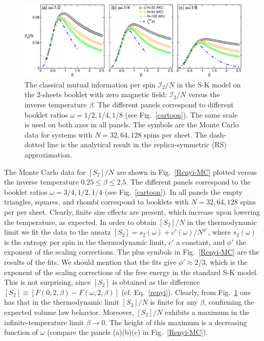 \documentclass[twocolumn,superscriptaddress,prb,10pt]{revtex4-1}
\begin{document}
\begin{figure}[t]
\includegraphics*[width=0.93\linewidth]{./draft_figs/I2_MC_v1}
\caption{The classical mutual information per spin ${\mathcal I}_2/N$ 
 in the S-K model on the $2$-sheets booklet with zero magnetic field: 
 ${\mathcal I}_2/N$ versus the inverse temperature $\beta$. The 
 different panels correspond to different booklet ratios $\omega=1/2,1/4,1/8$ 
 (see Fig.~\ref{cartoon}). The same scale is used on both axes in all 
 panels. The symbols are the Monte Carlo data 
 for systems with $N=32,64,128$ spins per sheet. The dash-dotted line is 
 the analytical result in the replica-symmetric (RS) approximation.  
}
\label{I2-MC}
\end{figure}

The Monte Carlo data for $[S_2]/N$  are shown in Fig.~\ref{Renyi-MC} plotted versus the 
inverse temperature $0.25\le\beta\le 2.5$. The different panels correspond to the  
booklet ratios $\omega=3/4,1/2,1/4$ (see Fig.~\ref{cartoon}). In all panels the empty 
triangles, squares, and rhombi correspond to booklets with $N=32,64,128$ spins per per sheet. 
Clearly, finite size effects are present, which increase upon lowering 
the temperature, as expected. In order to obtain $[S_2]/N$ in the thermodynamic limit 
we fit the data to the ansatz $[S_2]=s_2(\omega)+c'(\omega)/N^{\phi'}$, where 
$s_2(\omega)$ is the entropy per spin in the thermodynamic limit, $c'$ a constant, and 
$\phi'$ the exponent of the scaling corrections. The plus symbols in Fig.~\ref{Renyi-MC} 
are the results of the fits. We should mention that the fits give $\phi'\approx 2/3$, 
which is the exponent of the scaling corrections of the free energy in the standard 
S-K model. This is not surprising, since $[S_2]$ is obtained as the difference 
$[S_2]\equiv [F(0,2,\beta)-F(\omega,2,\beta)]$ (cf. Eq.~\eqref{renyi}). 
Clearly, from Fig.~\ref{I2-MC} one has that in the thermodynamic limit $[S_2]/N$ is 
finite for any $\beta$, confirming the expected volume law behavior. Moreover, $[S_2]/N$ 
exhibits a maximum in the infinite-temperature limit $\beta\to0$. The height of this 
maximum  is a decreasing function of $\omega$ (compare the panels (a)(b)(c) in 
Fig.~\ref{Renyi-MC}). 
\end{document}

